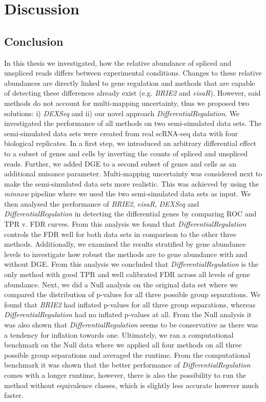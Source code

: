 

\chapter{Discussion}

\section{Conclusion} 
In this thesis we investigated, how the relative abundance of spliced and unspliced reads differs between experimental conditions. Changes to these relative abundances are directly linked to gene regulation and methods that are capable of detecting these differences already exist (e.g. \emph{BRIE2} and \emph{eisaR}). However, said methods do not account for multi-mapping uncertainty, thus we proposed two solutions: i) \emph{DEXSeq} and ii) our novel approach \emph{DifferentialRegulation}. We investigated the performance of all methods on two semi-simulated data sets. The semi-simulated data sets were created from real scRNA-seq data with four biological replicates. In a first step, we introduced an arbitrary differential effect to a subset of genes and cells by inverting the counts of spliced and unspliced reads. Further, we added DGE to a second subset of genes and cells as an additional nuisance parameter. Multi-mapping uncertainty was considered next to make the semi-simulated data sets more realistic. This was achieved by using the \emph{minnow} pipeline where we used the two semi-simulated data sets as input. We then analysed the performance of \emph{BRIE2}, \emph{eisaR}, \emph{DEXSeq} and \emph{DifferentialRegulation} in detecting the differential genes by comparing ROC and TPR v. FDR curves. From this analysis we found that \emph{DifferentialRegulation} controls the FDR well for both data sets in comparison to the other three methods. Additionally, we examined the results stratified by gene abundance levels to investigate how robust the methods are to gene abundance with and without DGE. From this analysis we concluded that \emph{DifferentialRegulation} is the only method with good TPR and well calibrated FDR across all levels of gene abundance. Next, we did a Null analysis on the original data set where we compared the distribution of p-values for all three possible group separations. We found that \emph{BRIE2} had inflated p-values for all three group separations, whereas \emph{DifferentialRegulation} had no inflated p-values at all. From the Null analysis it was also shown that \emph{DifferentialRegulation} seems to be conservative as there was a tendency for inflation towards one. Ultimately, we ran a computational benchmark on the Null data where we applied all four methods on all three possible group separations and averaged the runtime. From the computational benchmark it was shown that the better performance of \emph{DifferentialRegulation} comes with a longer runtime, however, there is also the possibility to run the method without equivalence classes, which is slightly less accurate however much faster.

